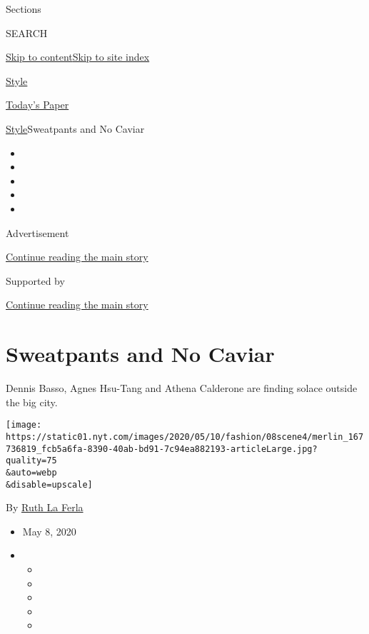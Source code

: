 Sections

SEARCH

\protect\hyperlink{site-content}{Skip to
content}\protect\hyperlink{site-index}{Skip to site index}

\href{https://www.nytimes.com/section/style}{Style}

\href{https://myaccount.nytimes.com/auth/login?response_type=cookie\&client_id=vi}{}

\href{https://www.nytimes.com/section/todayspaper}{Today's Paper}

\href{/section/style}{Style}\textbar{}Sweatpants and No Caviar

\begin{itemize}
\item
\item
\item
\item
\item
\end{itemize}

Advertisement

\protect\hyperlink{after-top}{Continue reading the main story}

Supported by

\protect\hyperlink{after-sponsor}{Continue reading the main story}

\hypertarget{sweatpants-and-no-caviar}{%
\section{Sweatpants and No Caviar}\label{sweatpants-and-no-caviar}}

Dennis Basso, Agnes Hsu-Tang and Athena Calderone are finding solace
outside the big city.

\texttt{[image: https://static01.nyt.com/images/2020/05/10/fashion/08scene4/merlin\_167736819\_fcb5a6fa-8390-40ab-bd91-7c94ea882193-articleLarge.jpg?quality=75\\\&auto=webp\\\&disable=upscale]}

By \href{https://www.nytimes.com/by/ruth-la-ferla}{Ruth La Ferla}

\begin{itemize}
\item
  May 8, 2020
\item
  \begin{itemize}
  \item
  \item
  \item
  \item
  \item
  \end{itemize}
\end{itemize}

